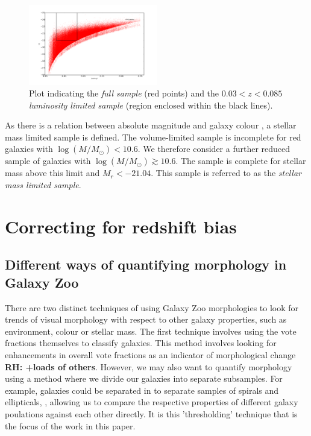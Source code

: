 \documentclass[useAMS,usenatbib]{mn2e}
\newcommand{\rh}[1]{{\bf \textcolor{RoyalPurple}{RH: #1}}}
\begin{document}
\begin{figure}
		\centering
		
        \includegraphics[width=0.5\textwidth]{Data_imgs/volume_limited_sample.pdf}
		
        \caption{Plot indicating the \textit{full sample} (red points) and the $0.03<z<0.085$ \textit{luminosity limited sample} (region enclosed within the black lines).}
		
        \label{fig:vl_sample}
        
\end{figure}



As there is a relation between absolute magnitude and galaxy colour \citep{Baldry_06}, a stellar mass limited sample is defined. The volume-limited sample is incomplete for red galaxies with $\log (M/M_{\odot}) < 10.6$. We therefore consider a further reduced sample of galaxies with $\log (M/M_{\odot}) \gtrsim 10.6$. The sample is complete for stellar mass above this limit and $M_r<-21.04$. This sample is referred to as the \textit{stellar mass limited sample}.


\section{Correcting for redshift bias}

\subsection{Different ways of quantifying morphology in Galaxy Zoo}

There are two distinct techniques of using Galaxy Zoo morphologies to look for trends of visual morphology with respect to other galaxy properties, such as environment, colour or stellar mass. The first technique involves using the vote fractions themselves to classify galaxies. This method involves looking for enhancements in overall vote fractions as an indicator of morphological change \citep{Bamford_09,Casteels_13,Willett_13}\rh{+loads of others}. However, we may also want to quantify morphology using a method where we divide our galaxies into separate subsamples. For example, galaxies could be separated in to separate samples of spirals and ellipticals, \citep{Skibba_09,Smethurst_15}, allowing us to compare the respective properties of different galaxy poulations against each other directly. It is this 'thresholding' technique that is the focus of the work in this paper.
\end{document}

